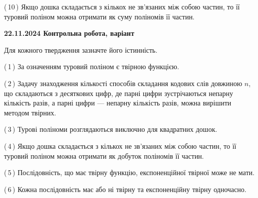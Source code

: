\documentclass[12pt, ukrainian]{article}
\begin{document}
\begin {large}
\begin {large}
\begin {large}
\begin {large}
\begin {large}
\begin {large}
\begin {large}
\begin {large}
\begin {large}
\begin {large}
\begin {large}
\begin {large}
\begin {large}
\begin {large}
\begin {large}
\begin {large}
\begin {large}
\begin {large}
\begin {large}
\begin {large}
\begin {large}
\begin {large}
\begin {large}
\begin {large}
\begin {large}
\begin {large}
\begin {large}
\begin {large}
\begin {large}
\begin {large}
\begin {large}
\begin {large}
\begin {large}
\begin {large}
\begin {large}
\begin {large}
\begin {large}
\begin {large}
\begin {large}
\begin {large}
\begin {large}
\begin {large}
\begin {large}
\begin {large}
\begin {large}
\begin {large}
{(\,10\,) Якщо дошка складається з кількох не зв’язаних між собою частин, то її туровий поліном можна отримати як суму поліномів її частин.%




\vspace{5mm}
}
\newpage

\begin {large}

\textbf{22.11.2024 Контрольна робота, варіант  }\par


{
Для кожного твердження зазначте його істинність.\par

\vspace{2mm}

(\,1\,) За означенням туровий поліном є твірною функцією.%



(\,2\,) Задачу знаходження кількості способів складання кодових слів довжиною $n$, що складаються з десяткових цифр, де парні цифри зустрічаються непарну кількість разів, а парні цифри — непарну кількість разів, можна вирішити методом твірних.%



(\,3\,) Турові поліноми розглядаються виключно для квадратних дошок.%



(\,4\,) Якщо дошка складається з кількох не зв’язаних між собою частин, то її туровий поліном можна отримати як добуток поліномів її частин.%



(\,5\,) Послідовність, що має твірну функцію, експоненційної твірної може не мати.%



(\,6\,) Кожна послідовність має або ні твірну та експоненційну твірну одночасно.%



}
\end{large}
\end{large}
\end{large}
\end{large}
\end{large}
\end{large}
\end{large}
\end{large}
\end{large}
\end{large}
\end{large}
\end{large}
\end{large}
\end{large}
\end{large}
\end{large}
\end{large}
\end{large}
\end{large}
\end{large}
\end{large}
\end{large}
\end{large}
\end{large}
\end{large}
\end{large}
\end{large}
\end{large}
\end{large}
\end{large}
\end{large}
\end{large}
\end{large}
\end{large}
\end{large}
\end{large}
\end{large}
\end{large}
\end{large}
\end{large}
\end{large}
\end{large}
\end{large}
\end{large}
\end{large}
\end{large}
\end{large}
\end{document}
